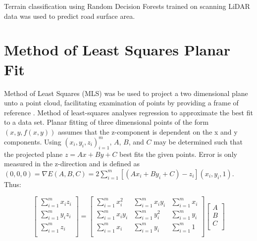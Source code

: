 \documentclass[numbered,pdftex]{ohio-etd}
\begin{document}
{{		{Terrain classification using Random Decision Forests trained on scanning LiDAR data was used to predict road surface area.}
	
	
	} %
	
	\section{Method of Least Squares Planar Fit}{
	
		{Method of Least Squares (MLS) was be used to project a two dimensional plane unto a point cloud, facilitating examination of points by providing a frame of reference \cite{miller_method_nodate, gojcic_perfect_2019}. Method of least-squares analyses regression to approximate the best fit to a data set. Planar fitting of three dimensional points of the form $(x,y, f(x,y))$ assumes that the z-component is dependent on the x and y components. Using ${(x_i, y_i, z_i)}_{i=1}^m$, $A$, $B$, and $C$ may be determined such that the projected plane $z = Ax + By + C$ best fits the given points. Error is only measured in the z-direction and is defined as $(0,0,0) = \nabla E(A, B, C) = 2\sum_{i=1}^{m}[(Ax_i + By_i + C) - z_i](x_i,y_i,1)$. Thus:}
	
		\begin{equation}
			\left[ {\begin{array}{cc}
					\sum_{i=1}^{m} x_i z_i \\
					\sum_{i=1}^{m} y_i z_i \\
					\sum_{i=1}^{m} z_i \\
					
			\end{array} } \right]
			=
			\left[ {\begin{array}{ccc}
					\sum_{i=1}^{m} x_i^2 		& \sum_{i=1}^{m} x_i y_i 		& \sum_{i=1}^{m} x_i \\
					\sum_{i=1}^{m} x_i y_i 		& \sum_{i=1}^{m} y_i^2 			& \sum_{i=1}^{m} y_i \\
					\sum_{i=1}^{m} x_i 			& \sum_{i=1}^{m} y_i 			& \sum_{i=1}^{m} 1   \\
			\end{array} } \right]
			\left[ {\begin{array}{cc}
					A\\
					B\\
					C\\
			\end{array} } \right]
			\label{FOV}
		\end{equation}
	
}}
\end{document}
